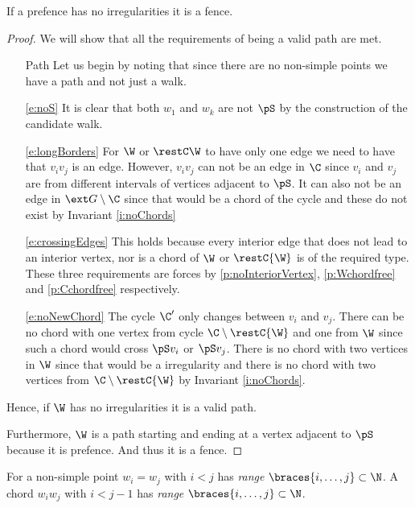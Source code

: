   \begin{lemma}
    \label{lm:red:regularPrefenceIsFence}
    If a prefence has no irregularities it is a fence.
  \end{lemma}
  \begin{proof}
    We will show that all the requirements of being a valid path are met.
   \begin{itemize}
     \item [Path] Let us begin by noting that since there are no non-simple points we have a path and not just a walk.

     \item[\ref{e:noS}] It is clear that both $w_1$ and $w_k$ are not $\pS$ by the construction of the candidate walk.

     \item[\ref{e:longBorders}] For $\W$ or $\restC \W$ to have only one edge we need to have that $v_i v_j$ is an edge. However, $v_i v_j$ can not be an edge in $\C$ since $v_i$ and $v_j$ are from different intervals of vertices adjacent to $\pS$. It can also not be an edge in $\ext G \setminus \C$ since that would be a chord of the cycle and these do not exist by Invariant \ref{i:noChords}

     \item[\ref{e:crossingEdges}]
     This holds because every interior edge that does not lead to an interior vertex, nor is a chord of $\W$ or $\restC{\W}$ is of the required type. These three requirements are forces by \ref{p:noInteriorVertex}, \ref{p:Wchordfree} and \ref{p:Cchordfree} respectively.

     \item[\ref{e:noNewChord}] The cycle $\C'$ only changes between $v_i$ and $v_j$. There can be no chord with one vertex from cycle $\C \setminus \restC{\W}$ and one from $\W$ since such a chord would cross $\pS v_i$ or $\pS v_j$. There is no chord with two vertices in $\W$ since that would be a irregularity and there is no chord with two vertices from $\C \setminus \restC{\W}$ by Invariant \ref{i:noChords}.
   \end{itemize}
   Hence, if $\W$ has no irregularities it is a valid path.

   Furthermore, $\W$ is a path starting and ending at a vertex adjacent to $\pS$ because it is prefence. And thus it is a fence.
  \end{proof}


  \begin{defi}
  For a non-simple point  $w_i = w_j$ with $i<j$ has \emph{range} $\braces{i, \ldots, j} \subset \N$.
  A chord $w_i w_j$ with $i< j-1$ has \emph{range} $\braces{i, \ldots, j} \subset \N$.
  \end{defi}

